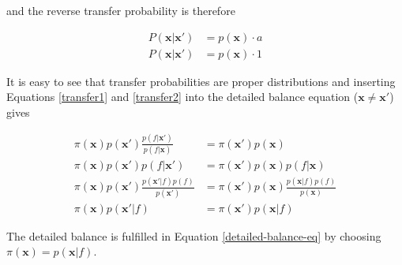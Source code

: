 \documentclass{article}
\begin{document}
and the reverse transfer probability is therefore

\begin{equation} \label{transfer2}
  \begin{aligned}
    P(\mathbf{x}|\mathbf{x}') &= p(\mathbf{x}) \cdot a \\
    P(\mathbf{x}|\mathbf{x}') &= p(\mathbf{x}) \cdot 1
  \end{aligned}
\end{equation}

It is easy to see that transfer probabilities are proper distributions and inserting Equations \ref{transfer1} and \ref{transfer2}
into the detailed balance equation ($\mathbf{x} \neq \mathbf{x}'$) gives 

\begin{equation} \label{detailed-balance-eq}
  \begin{aligned}
    \pi(\mathbf{x}) p(\mathbf{x}') \frac{p(f|\mathbf{x}')}{p(f|\mathbf{x})} &= \pi(\mathbf{x}')p(\mathbf{x}) \\
    \pi(\mathbf{x}) p(\mathbf{x}') p(f|\mathbf{x}') &= \pi(\mathbf{x}')p(\mathbf{x})p(f|\mathbf{x}) \\
    \pi(\mathbf{x}) p(\mathbf{x}') \frac{p(\mathbf{x}'|f)p(f)}{p(\mathbf{x}')} &= \pi(\mathbf{x}')p(\mathbf{x})\frac{p(\mathbf{x}|f)p(f)}{p(\mathbf{x})} \\
    \pi(\mathbf{x}) p(\mathbf{x}'|f) &= \pi(\mathbf{x}')p(\mathbf{x}|f)
  \end{aligned}
\end{equation}

The detailed balance is fulfilled in Equation \ref{detailed-balance-eq} by choosing $\pi(\mathbf{x}) = p(\mathbf{x}|f)$.
\end{document}
